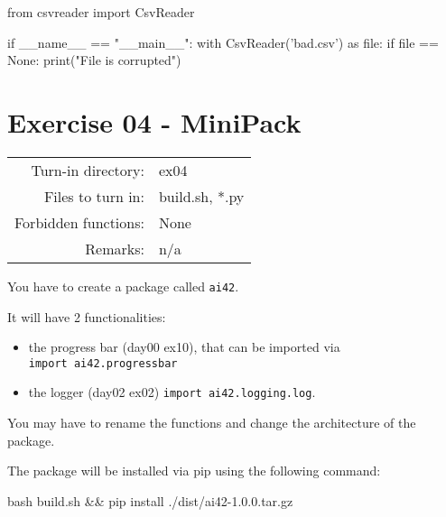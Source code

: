 \documentclass[]{article}
\newenvironment{Shaded}{\begin{snugshade}}{\end{snugshade}}
\newcommand{\BuiltInTok}[1]{\textcolor[rgb]{0.50,0.55,0.55}{#1}}
\newcommand{\ControlFlowTok}[1]{\textcolor[rgb]{0.99,0.74,0.29}{#1}}
\newcommand{\ImportTok}[1]{\textcolor[rgb]{0.15,0.68,0.38}{#1}}
\newcommand{\NormalTok}[1]{\textcolor[rgb]{0.81,0.81,0.76}{#1}}
\newcommand{\OperatorTok}[1]{\textcolor[rgb]{0.81,0.81,0.76}{#1}}
\newcommand{\StringTok}[1]{\textcolor[rgb]{0.96,0.31,0.31}{#1}}
\newcommand{\VariableTok}[1]{\textcolor[rgb]{0.15,0.68,0.68}{#1}}
\begin{document}
\begin{Shaded}
\begin{Highlighting}[]
\ImportTok{from}\NormalTok{ csvreader }\ImportTok{import}\NormalTok{ CsvReader}

\ControlFlowTok{if} \VariableTok{__name__} \OperatorTok{==} \StringTok{"__main__"}\NormalTok{:}
    \ControlFlowTok{with}\NormalTok{ CsvReader(}\StringTok{'bad.csv'}\NormalTok{) }\ImportTok{as} \BuiltInTok{file}\NormalTok{:}
        \ControlFlowTok{if} \BuiltInTok{file} \OperatorTok{==} \VariableTok{None}\NormalTok{:}
            \BuiltInTok{print}\NormalTok{(}\StringTok{"File is corrupted"}\NormalTok{)}
\end{Highlighting}
\end{Shaded}

\clearpage

\hypertarget{exercise-04---minipack-1}{%
\section{Exercise 04 - MiniPack}\label{exercise-04---minipack-1}}

\begin{longtable}[]{@{}rl@{}}
\toprule
\endhead
Turn-in directory: & ex04\tabularnewline
Files to turn in: & build.sh, *.py\tabularnewline
Forbidden functions: & None\tabularnewline
Remarks: & n/a\tabularnewline
\bottomrule
\end{longtable}

You have to create a package called \texttt{ai42}.

It will have 2 functionalities:

\begin{itemize}
\item
  the progress bar (day00 ex10), that can be imported via
  \texttt{import\ ai42.progressbar}
\item
  the logger (day02 ex02) \texttt{import\ ai42.logging.log}.
\end{itemize}

You may have to rename the functions and change the architecture of the
package.

The package will be installed via pip using the following command:

\begin{Shaded}
\begin{Highlighting}[]
\NormalTok{bash build.sh && pip install ./dist/ai42-1.0.0.tar.gz}
\end{Highlighting}
\end{Shaded}
\end{document}
